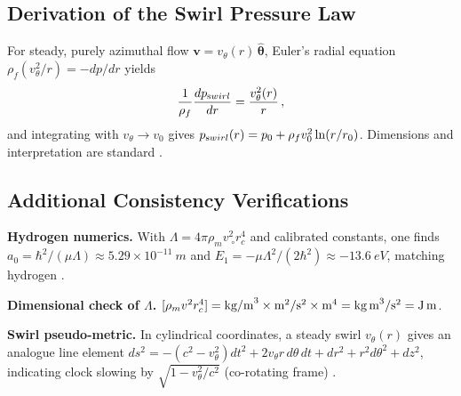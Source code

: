 \documentclass[11pt]{article}
\begin{document}
	\subsection{Derivation of the Swirl Pressure Law}
	For steady, purely azimuthal flow $\mathbf{v}=v_\theta(r)\,\hat{\boldsymbol{\theta}}$, Euler’s radial equation $\rho_f (v_\theta^2/r)=-dp/dr$ yields
	\[
		\frac{1}{\rho_f}\frac{d p_{\textrm swirl}}{dr} = \frac{v_\theta^2(r)}{r}\,,
	\]
	and integrating with $v_\theta\to v_0$ gives $p_{\textrm swirl}(r)=p_0+\rho_f v_0^2\ln(r/r_0)$. Dimensions and interpretation are standard \cite{Batchelor1967,Saffman1992,Iskandarani2025Canon034}.

	\subsection{Additional Consistency Verifications}
	\textbf{Hydrogen numerics.} With $\Lambda=4\pi\rho_m v_{\!\!\;\circ}^2 r_c^4$ and calibrated constants, one finds $a_0=\hbar^2/(\mu\Lambda)\approx 5.29\times10^{-11}~\si{m}$ and $E_1=-\mu\Lambda^2/(2\hbar^2)\approx -13.6~\si{eV}$, matching hydrogen \cite{Iskandarani2025Canon034,Iskandarani2025Hydrogen}.

	\textbf{Dimensional check of $\Lambda$.} $[\rho_m v^2 r_c^4] = \text{kg/m}^3\times \text{m}^2/\text{s}^2\times \text{m}^4 = \text{kg\,m}^3/\text{s}^2 = \text{J\,m}$.

	\textbf{Swirl pseudo-metric.} In cylindrical coordinates, a steady swirl $v_\theta(r)$ gives an analogue line element $ds^2 = -(c^2 - v_\theta^2)dt^2 + 2 v_\theta r\,d\theta\,dt + dr^2 + r^2 d\theta^2 + dz^2$, indicating clock slowing by $\sqrt{1-v_\theta^2/c^2}$ (co-rotating frame) \cite{Iskandarani2025Canon034}.
\end{document}
